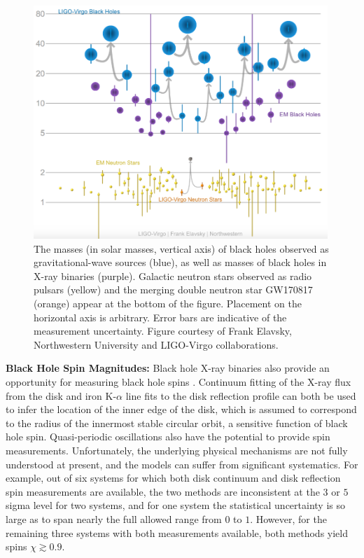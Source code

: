 \documentclass[iop,onecolumn]{revtex4}
\begin{document}
\begin{figure}
	\centering
	\includegraphics[width=0.99\textwidth]{Graveyard.png}%
	\caption{\label{fig:BHmasses}  The masses (in solar masses, vertical axis) of black holes observed as gravitational-wave sources (blue), as well as masses of black holes in X-ray binaries (purple).  Galactic neutron stars observed as radio pulsars (yellow) and the merging double neutron star GW170817 (orange) appear at the bottom of the figure.  Placement on the horizontal axis is arbitrary.  Error bars are indicative of the measurement uncertainty.  Figure courtesy of Frank Elavsky, Northwestern University and LIGO-Virgo collaborations.}
\end{figure}


\textbf{Black Hole Spin Magnitudes:} Black hole X-ray binaries also provide an opportunity for measuring black hole spins \citep[see][for a recent review]{MillerMiller:2015}.  Continuum fitting of the X-ray flux from the disk and iron K-$\alpha$ line fits to the disk reflection profile can both be used to infer the location of the inner edge of the disk, which is assumed to correspond to the radius of the innermost stable circular orbit, a sensitive function of black hole spin.  Quasi-periodic oscillations also have the potential to provide spin measurements.  Unfortunately, the underlying physical mechanisms are not fully understood at present, and the models can suffer from significant systematics.  For example, out of six systems for which both disk continuum and disk reflection spin measurements are available, the two methods are inconsistent at the $3$ or $5$ sigma level for two systems, and for one system the statistical uncertainty is so large as to span nearly the full allowed range from $0$ to $1$.  However, for the remaining three systems with both measurements available, both methods yield spins $\chi \gtrsim 0.9$.  
\end{document}
